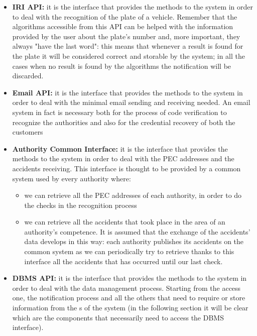 \begin{itemize}
			\item \textbf{IRI API:} it is the interface that provides the methods to the system in order to deal with the recognition of the plate of a vehicle. Remember that the algorithms accessible from this API can be helped with the information provided by the user about the plate's number and, more important, they always "have the last word": this means that whenever a result is found for the plate it will be considered correct and storable by the system; in all the cases when no result is found by the algorithms the notification will be discarded.
			
			\item \textbf{Email API:} it is the interface that provides the methods to the system in order to deal with the minimal email sending and receiving needed. An email system in fact is necessary both for the process of code verification to recognize the authorities and also for the credential recovery of both the customers
			
			\item \textbf{Authority Common Interface:} it is the interface that provides the methods to the system in order to deal with the PEC addresses and the accidents receiving. This interface is thought to be provided by a common system used by every authority where:
			
			\begin{itemize}
				\item we can retrieve all the PEC addresses of each authority, in order to do the checks in the recognition process
				\item we can retrieve all the accidents that took place in the area of an authority's competence. It is assumed that the exchange of the accidents' data develops in this way: each authority publishes its accidents on the common system as we can periodically try to retrieve thanks to this interface all the accidents that has occurred until our last check.
			\end{itemize}
		
			\item \textbf{DBMS API:} it is the interface that provides the methods to the system in order to deal with the data management process. Starting from the access one, the notification process and all the others that need to require or store information from the s of the system (in the following section it will be clear which are the components that necessarily need to access the DBMS interface).
			 
		\end{itemize}
	
